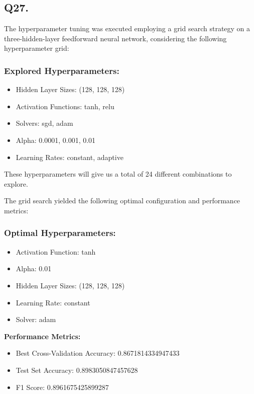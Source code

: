 \documentclass{article}
\begin{document}
\subsection*{Q27.}


The hyperparameter tuning was executed employing a grid search strategy on a three-hidden-layer feedforward neural network, considering the following hyperparameter grid:

\subsubsection*{Explored Hyperparameters:}
\begin{itemize}
    \item Hidden Layer Sizes: (128, 128, 128)
    \item Activation Functions: tanh, relu
    \item Solvers: sgd, adam
    \item Alpha: 0.0001, 0.001, 0.01
    \item Learning Rates: constant, adaptive
\end{itemize}

These hyperparameters will give us a total of 24 different combinations to explore. 

The grid search yielded the following optimal configuration and performance metrics:

\subsubsection*{Optimal Hyperparameters:}
\begin{itemize}
    \item Activation Function: tanh
    \item Alpha: 0.01
    \item Hidden Layer Sizes: (128, 128, 128)
    \item Learning Rate: constant
    \item Solver: adam
\end{itemize}

\textbf{Performance Metrics:}
\begin{itemize}
    \item Best Cross-Validation Accuracy: 0.8671814334947433
    \item Test Set Accuracy: 0.8983050847457628
    \item F1 Score: 0.8961675425899287
\end{itemize}
\end{document}
